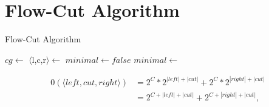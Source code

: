 \chapter{Flow-Cut Algorithm}\label{cha:flowCut}

\begin{algorithm}
\begin{algorithmic}[1]
\caption{Flow-Cut Algorithm}\label{alg:flowCut}
\State $cg \gets$ 
\State $\langle$l,c,r$\rangle \gets$ 
\State $minimal \gets false$
\State $minimal \gets$ 
\EndWhile
\State \Return {}
\EndProcedure
\end{algorithmic}
\end{algorithm}


\begin{equation}
\begin{aligned}
0(\langle left,cut,right\rangle) &= 2^C * 2^{|left|+|cut|} + 2^C * 2^{|right|+|cut|}\\
&= 2^{C+|left|+|cut|} + 2^{C+|right|+|cut|},
\end{aligned}
\end{equation}
